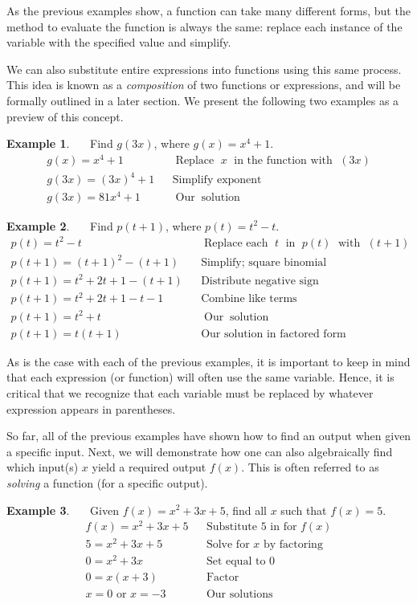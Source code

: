 \documentclass[12pt]{book}
\theoremstyle{definition}
\newtheorem{example}{Example}
\newcommand{\tmop}[1]{\ensuremath{\operatorname{#1}}}
\begin{document}
As the previous examples show, a function can take many different forms, but the method to evaluate the function is always the same: replace each instance of the variable with the specified value and simplify.\par
We can also substitute entire expressions into functions using this same process.  This idea is known as a {\it composition} of two functions or expressions, and will be formally outlined in a later section.  We present the following two examples as a preview of this concept.
\begin{example}~~~Find $g(3x)$, where $g(x)=x^4+1$.
  \begin{eqnarray*}
    g (x) = x^4 + 1 &  & \tmop{Replace~} x \tmop{~in~the~function~with~}(3 x)\\
    g (3 x) = (3 x)^4 + 1 &  & \tmop{Simplify~exponent}\\
    g (3 x) = 81 x^4 + 1 &  & \tmop{Our} \tmop{solution}
  \end{eqnarray*}
\end{example}
\begin{example}~~~Find $p(t+1)$, where $p(t)=t^2-t$.
  \begin{eqnarray*}
    p (t) = t^2 - t &  & \tmop{Replace~each~} t
    \tmop{~in~} p (t) \tmop{~with~} (t + 1)\\
    p (t + 1) = (t + 1)^2 - (t + 1) &  & \tmop{Simplify;~square~binomial}\\
    p (t + 1) = t^2 + 2 t + 1 - (t + 1) &  & \tmop{Distribute~negative~sign}\\
    p (t + 1) = t^2 + 2 t + 1 - t - 1 &  & \tmop{Combine~like~terms}\\
    p (t + 1) = t^2 + t &  & \tmop{Our} \tmop{solution}\\
    p (t + 1) = t(t + 1) &  & \tmop{Our~solution~in~factored~form}
  \end{eqnarray*}
\end{example}
As is the case with each of the previous examples, it is important to keep in mind that each expression (or function) will often use the same variable.  Hence, it is critical that we recognize that each variable must be replaced by whatever expression appears in parentheses.\par
So far, all of the previous examples have shown how to find an output when given a specific input.  Next, we will demonstrate how one can also algebraically find which input(s) $x$ yield a required output $f(x)$.  This is often referred to as {\it solving} a function (for a specific output). 
\begin{example}~~~Given $f(x)=x^2+3x+5$, find all $x$ such that $f(x)=5$.
  \begin{eqnarray*}
			f (x) = x^2+3x+5 & & \text{Substitute~5~in~for~} f(x)\\
			5 = x^2+3x+5  &  & \text{Solve for~} x \text{~by~factoring}\\
			0 = x^2+3x  &  & \text{Set~equal~to~0}\\
			0 = x(x+3)  &  & \text{Factor}\\
			x=0 \text{~or~} x= -3  & & \text{Our solutions}
\end{eqnarray*}
\end{example}
\end{document}
